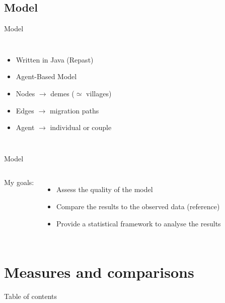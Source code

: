 \documentclass[10pt, aspectratio=43]{beamer}
\begin{document}
\subsection{Model}
\begin{frame}{}{Model}
\vspace*{-0.8cm}
\begin{columns}

  \color{masseyWhite}
  \begin{itemize}
    \item Written in Java (Repast)
    \item Agent-Based Model
    \item Nodes $\rightarrow$ demes ($\simeq$ villages)
    \item Edges $\rightarrow$ migration paths
    \item Agent $\rightarrow$ individual or couple
  \end{itemize}

\end{columns}
\end{frame}

\begin{frame}{}{Model}
\vspace*{-0.8cm}
\begin{columns}

  \color{masseyWhite}
  My goals:
  \begin{itemize}
    \item Assess the quality of the model
    \item Compare the results to the observed data (reference)
    \item Provide a statistical framework to analyse the results
  \end{itemize}

\end{columns}
\end{frame}


\section{Measures and comparisons}
\begin{frame}{}{Table of contents}
\tableofcontents[currentsection, subsectionstyle=show/show/hide]
\end{frame}
\end{document}
